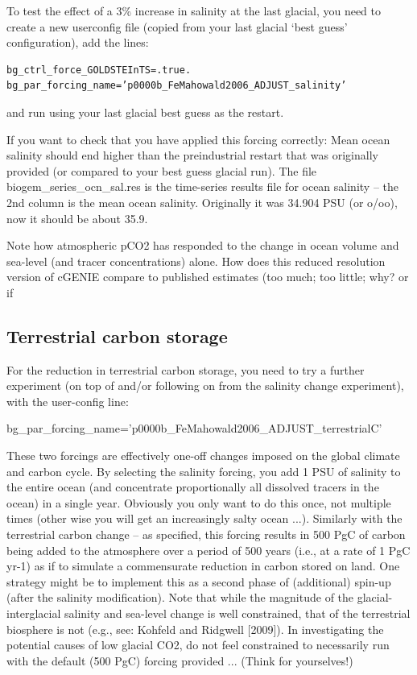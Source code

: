 \documentclass[11pt,fleqn]{book} %
\begin{document}
To test the effect of a 3\% increase in salinity at the last glacial, you need to create a new userconfig
file (copied from your last glacial ‘best guess’ configuration), add the lines:
\vspace{-2mm}\begin{verbatim}
bg_ctrl_force_GOLDSTEInTS=.true.
bg_par_forcing_name=’p0000b_FeMahowald2006_ADJUST_salinity’
\end{verbatim}\vspace{-2mm}
and run using your last glacial best guess as the restart.

If you want to check that you have applied this forcing correctly: Mean ocean salinity should end higher than the preindustrial restart that was
originally provided (or compared to your best guess glacial run). The file
biogem\_series\_ocn\_sal.res is the time-series results file for ocean salinity – the 2nd
column is the mean ocean salinity. Originally it was 34.904 PSU (or o/oo), now it should be
about 35.9.

Note how atmospheric pCO2 has responded to the change in ocean volume and sea-level
(and tracer concentrations) alone. How does this reduced resolution version of cGENIE
compare to published estimates (too much; too little; why? or if

%
\subsection{Terrestrial carbon storage}

For the reduction in terrestrial carbon storage, you need to try a further experiment (on top of
and/or following on from the salinity change experiment), with the user-config line:

bg\_par\_forcing\_name=’p0000b\_FeMahowald2006\_ADJUST\_terrestrialC’

These two forcings are effectively one-off changes imposed on the global climate and carbon
cycle. By selecting the salinity forcing, you add 1 PSU of salinity to the entire ocean (and
concentrate proportionally all dissolved tracers in the ocean) in a single year. Obviously you only
want to do this once, not multiple times (other wise you will get an increasingly salty ocean ...).
Similarly with the terrestrial carbon change – as specified, this forcing results in 500 PgC of carbon
being added to the atmosphere over a period of 500 years (i.e., at a rate of 1 PgC yr-1) as if to
simulate a commensurate reduction in carbon stored on land. One strategy might be to implement
this as a second phase of (additional) spin-up (after the salinity modification). Note that while the
magnitude of the glacial-interglacial salinity and sea-level change is well constrained, that of the
terrestrial biosphere is not (e.g., see: Kohfeld and Ridgwell [2009]). In investigating the potential
causes of low glacial CO2, do not feel constrained to necessarily run with the default (500 PgC)
forcing provided ... (Think for yourselves!)
\end{document}
